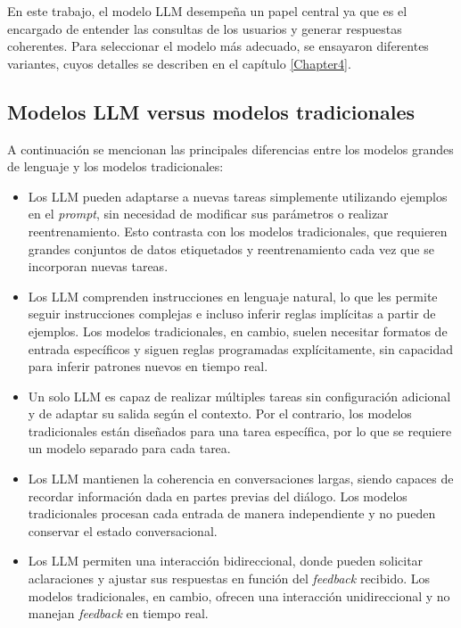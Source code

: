En este trabajo, el modelo LLM desempeña un papel central ya que es el encargado de entender las consultas de 
los usuarios y generar respuestas coherentes. Para seleccionar el modelo más adecuado, 
se ensayaron diferentes variantes, cuyos detalles se describen en el capítulo \ref{Chapter4}.

\vspace{5mm}

\subsection{Modelos LLM versus modelos tradicionales}

A continuación se mencionan las principales diferencias entre los modelos grandes de lenguaje y los
modelos tradicionales:

\begin{itemize}
	\item Los LLM pueden adaptarse a nuevas tareas simplemente utilizando ejemplos en el \textit{prompt}, 
	sin necesidad de modificar sus parámetros o realizar reentrenamiento. Esto contrasta con los modelos tradicionales, 
	que requieren grandes conjuntos de datos etiquetados y reentrenamiento cada vez que se incorporan nuevas tareas.
	\item Los LLM comprenden instrucciones en lenguaje natural, lo que les permite seguir instrucciones complejas e 
	incluso inferir reglas implícitas a partir de ejemplos. Los modelos tradicionales, en cambio, suelen necesitar 
	formatos de entrada específicos y siguen reglas programadas explícitamente, sin capacidad para inferir patrones 
	nuevos en tiempo real.
	\item Un solo LLM es capaz de realizar múltiples tareas sin configuración adicional y de adaptar su salida según 
	el contexto. Por el contrario, los modelos tradicionales están diseñados para una tarea específica, por lo que 
	se requiere un modelo separado para cada tarea.
	\item Los LLM mantienen la coherencia en conversaciones largas, siendo capaces de recordar información dada en 
	partes previas del diálogo. Los modelos tradicionales procesan cada entrada de manera independiente y no pueden 
	conservar el estado conversacional.
	\item Los LLM permiten una interacción bidireccional, donde pueden solicitar aclaraciones y ajustar sus respuestas 
	en función del \textit{feedback} recibido. Los modelos tradicionales, en cambio, ofrecen una interacción unidireccional
	y no manejan \textit{feedback} en tiempo real.
\end{itemize}

